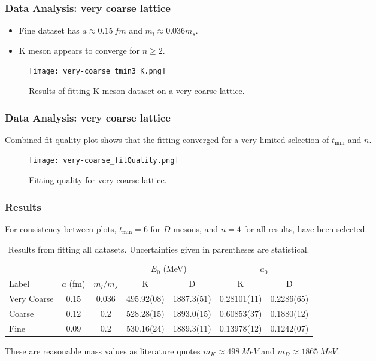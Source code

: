 \documentclass{beamer}
\begin{document}
\begin{frame}
    \frametitle{Data Analysis: very coarse lattice}
    \begin{itemize}
        \item Fine dataset has $a \approx \SI{0.15}{fm}$ and $m_l \approx 0.036 m_s$.
        \item K meson appears to converge for $n \geq 2$.
    \end{itemize}
    \begin{figure}
        \centering
        \texttt{[image: very-coarse\_tmin3\_K.png]}
        \caption{Results of fitting K meson dataset on a very coarse lattice.}
    \end{figure}
\end{frame}

\begin{frame}
    \frametitle{Data Analysis: very coarse lattice}
    Combined fit quality plot shows that the fitting converged for a very limited selection of $t_\mathrm{min}$ and $n$.
    \begin{figure}
        \centering
        \texttt{[image: very-coarse\_fitQuality.png]}
        \caption{Fitting quality for very coarse lattice.}
    \end{figure}
\end{frame}

\begin{frame}
    \frametitle{Results}
    For consistency between plots, $t_\mathrm{min}=6$ for $D$ mesons, and $n=4$ for all results, have been selected.
    \begin{table}
    \centering
    \tiny
    \begin{tabular}{l S[table-format=1.2] S[table-format=1.3] S[table-format=3.2(2)] S[table-format=4.1(2)] S[table-format=1.5(2)] S[table-format=1.4(2)]}
        \toprule
                    &                   &                   &        & \\
        \cmidrule(lr){4-5}\cmidrule(lr){6-7}
        Label       & {$a$ (\si{fm})}   & {$m_l / m_s$}     & {K}               & {D}               & {K}                & {D}\\
        \midrule
        Very Coarse & 0.15              & 0.036             & 495.92(08)        & 1887.3(51)        & 0.28101(11)        & 0.2286(65)\\
        Coarse      & 0.12              & 0.2               & 528.28(15)        & 1893.0(15)        & 0.60853(37)        & 0.1880(12)\\
        Fine        & 0.09              & 0.2               & 530.16(24)        & 1889.3(11)        & 0.13978(12)        & 0.1242(07)\\
        \bottomrule
    \end{tabular}
    \normalsize
    \caption{Results from fitting all datasets. Uncertainties given in parentheses are statistical.}
    \end{table}
    These are reasonable mass values as literature\cite{zyla2020review} quotes $m_K \approx \SI{498}{MeV}$ and $m_D \approx \SI{1865}{MeV}$.
\end{frame}
\end{document}

